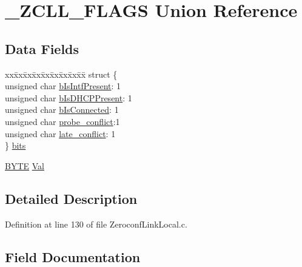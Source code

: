 \hypertarget{union___z_c_l_l___f_l_a_g_s}{}\section{\+\_\+\+Z\+C\+L\+L\+\_\+\+F\+L\+A\+G\+S Union Reference}
\label{union___z_c_l_l___f_l_a_g_s}
\subsection*{Data Fields}
\begin{DoxyCompactItemize}
\item 
\begin{tabbing}
xx\=xx\=xx\=xx\=xx\=xx\=xx\=xx\=xx\=\kill
struct \{\\
\>unsigned char \hyperlink{union___z_c_l_l___f_l_a_g_s_a2760b43605cdbc62476ad563dbf84111}{bIsIntfPresent}: 1\\
\>unsigned char \hyperlink{union___z_c_l_l___f_l_a_g_s_a907a8f95c20a08e1219e12db83029bea}{bIsDHCPPresent}: 1\\
\>unsigned char \hyperlink{union___z_c_l_l___f_l_a_g_s_a7d841d528ea341211438e0634c03fa1c}{bIsConnected}: 1\\
\>unsigned char \hyperlink{union___z_c_l_l___f_l_a_g_s_adaafea479c46630855a27328c443ada2}{probe\_conflict}:1\\
\>unsigned char \hyperlink{union___z_c_l_l___f_l_a_g_s_a27d528dc16aa3432087922054b03ddd1}{late\_conflict}: 1\\
\} \hyperlink{union___z_c_l_l___f_l_a_g_s_a95cc683fd69edbf8b6c958b95e52fba3}{bits}\\

\end{tabbing}\item 
\hyperlink{_generic_type_defs_8h_a4ae1dab0fb4b072a66584546209e7d58}{B\+Y\+T\+E} \hyperlink{union___z_c_l_l___f_l_a_g_s_a5ab8c2bf45b20b5f7aa3a4f083896cec}{Val}
\end{DoxyCompactItemize}


\subsection{Detailed Description}


Definition at line 130 of file Zeroconf\+Link\+Local.\+c.



\subsection{Field Documentation}
\hypertarget{union___z_c_l_l___f_l_a_g_s_a7d841d528ea341211438e0634c03fa1c}{}
